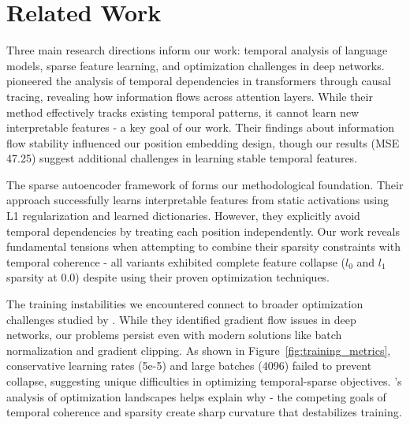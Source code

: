%
%
%

\section{Related Work}
Three main research directions inform our work: temporal analysis of language models, sparse feature learning, and optimization challenges in deep networks. \cite{elhage2022solu} pioneered the analysis of temporal dependencies in transformers through causal tracing, revealing how information flows across attention layers. While their method effectively tracks existing temporal patterns, it cannot learn new interpretable features - a key goal of our work. Their findings about information flow stability influenced our position embedding design, though our results (MSE 47.25) suggest additional challenges in learning stable temporal features.

The sparse autoencoder framework of \cite{anthropic2022decomposition} forms our methodological foundation. Their approach successfully learns interpretable features from static activations using L1 regularization and learned dictionaries. However, they explicitly avoid temporal dependencies by treating each position independently. Our work reveals fundamental tensions when attempting to combine their sparsity constraints with temporal coherence - all variants exhibited complete feature collapse ($l_0$ and $l_1$ sparsity at 0.0) despite using their proven optimization techniques.

The training instabilities we encountered connect to broader optimization challenges studied by \cite{Glorot2010UnderstandingTD}. While they identified gradient flow issues in deep networks, our problems persist even with modern solutions like batch normalization and gradient clipping. As shown in Figure~\ref{fig:training_metrics}, conservative learning rates (5e-5) and large batches (4096) failed to prevent collapse, suggesting unique difficulties in optimizing temporal-sparse objectives. \cite{Zhang2016UnderstandingDL}'s analysis of optimization landscapes helps explain why - the competing goals of temporal coherence and sparsity create sharp curvature that destabilizes training.

